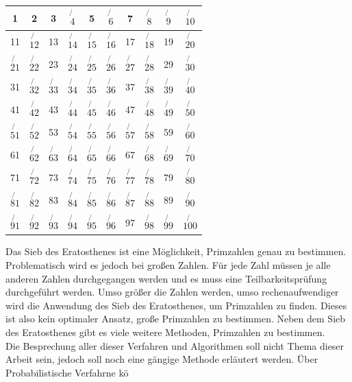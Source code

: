 \begin{center}
\begin{tabular}{|c|c|c|c|c|c|c|c|c|c|}
\hline 1 & 2 & 3 & $\not{4}$ & 5 &
$\not{6}$ & 7 & $\not{8}$ & $\not{9}$ & $\not{10}$ \\ \hline 11 & $\not{12}$
& 13 & $\not{14}$ & $\not{15}$ & $\not{16}$ & 17 & $\not{18}$ & 19 &
$\not{20}$ \\ \hline $\not{21}$ & $\not{22}$ & 23 & $\not{24}$ & $\not{25}$
& $\not{26}$ & $\not{27}$ & $\not{28}$ & 29 & $\not{30}$ \\ \hline 31 &
$\not{32}$ & $\not{33}$ & $\not{34}$ & $\not{35}$ & $\not{36}$ & 37 &
$\not{38}$ & $\not{39}$ & $\not{40}$ \\ \hline 41 & $\not{42}$ & 43 &
$\not{44}$ & $\not{45}$ & $\not{46}$ & 47 & $\not{48}$ & $\not{49}$ &
$\not{50}$ \\ \hline $\not{51}$ & $\not{52}$ & 53 & $\not{54}$ & $\not{55}$
& $\not{56}$ & $\not{57}$ & $\not{58}$ & 59 & $\not{60}$ \\ \hline 61 &
$\not{62}$ & $\not{63}$ & $\not{64}$ & $\not{65}$ & $\not{66}$ & 67 &
$\not{68}$ & $\not{69}$ & $\not{70}$ \\ \hline 71 & $\not{72}$ & 73 &
$\not{74}$ & $\not{75}$ & $\not{76}$ & $\not{77}$ & $\not{78}$ & 79 &
$\not{80}$ \\ \hline $\not{81}$ & $\not{82}$ & 83 & $\not{84}$ & $\not{85}$
& $\not{86}$ & $\not{87}$ & $\not{88}$ & 89 & $\not{90}$ \\ \hline
$\not{91}$ & $\not{92}$ & $\not{93}$ & $\not{94}$ & $\not{95}$ & $\not{96}$
& 97 & $\not{98}$ & $\not{99}$ & $\not{100}$ \\ \hline
\end{tabular}
\end{center}

Das Sieb des Eratosthenes ist eine Möglichkeit, Primzahlen genau zu bestimmen. Problematisch wird es jedoch bei großen Zahlen. Für jede Zahl müssen je alle anderen Zahlen durchgegangen werden und es muss eine Teilbarkeitsprüfung durchgeführt werden. Umso größer die Zahlen werden, umso rechenaufwendiger wird die Anwendung des Sieb des Eratosthenes, um Primzahlen zu finden. Dieses ist also kein optimaler Ansatz, große Primzahlen zu bestimmen. Neben dem Sieb des Eratosthenes gibt es viele weitere Methoden, Primzahlen zu bestimmen.\\

Die Besprechung aller dieser Verfahren und Algorithmen soll nicht Thema dieser Arbeit sein, jedoch soll noch eine gängige Methode erläutert werden. Über Probabilistische Verfahrne kö

